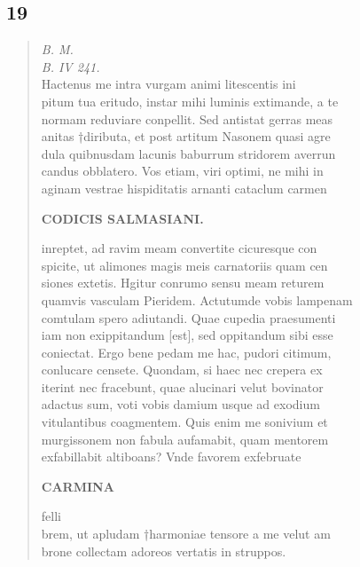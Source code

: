\documentclass[11pt, a4paper]{report}
\begin{document}
            \subsection*{19}
      \begin{verse}
      \textit{B. M.} \\ \textit{B. IV 241.}
                    \\Hactenus me intra vurgam animi litescentis ini\\pitum tua eritudo,
                    instar mihi luminis extimande, a te \\normam reduviare conpellit. Sed
                    antistat gerras meas \\anitas †diributa, et post artitum Nasonem quasi
                        agre\\dula quibnusdam lacunis baburrum stridorem averrun\\candus
                    obblatero. Vos etiam, viri optimi, ne mihi in \\aginam vestrae hispiditatis
                    arnanti cataclum carmen 
        ﻿\pagebreak 
    
                    \begin{center} \textbf{CODICIS SALMASIANI.} \end{center}
                     \marginpar{[83]} 
                    inreptet, ad ravim meam convertite cicuresque con\\spicite, ut alimones
                    magis meis carnatoriis quam cen\\siones extetis. Hgitur conrumo sensu
                    meam returem \\quamvis vasculam Pieridem. Actutumde vobis lampenam
                    \\comtulam spero adiutandi. Quae cupedia praesumenti \\iam non
                    exippitandum [est], sed oppitandum sibi esse \\coniectat. Ergo bene pedam me
                    hac, pudori citimum, \\conlucare censete. Quondam, si haec nec crepera
                    ex\\iterint nec fracebunt, quae alucinari velut bovinator \\adactus sum,
                    voti vobis damium usque ad exodium \\vitulantibus coagmentem. Quis enim me
                    sonivium et \\murgissonem non fabula aufamabit, quam mentorem
                    \\exfabillabit altiboans? Vnde favorem exfebruate 
        ﻿\pagebreak 
    
                    \begin{center} \textbf{CARMINA} \end{center}
                     \marginpar{[84]}  felli\\brem, ut apludam †harmoniae tensore a me
                    velut am\\brone collectam adoreos vertatis in struppos. 
      \end{verse}
  
\end{document}
